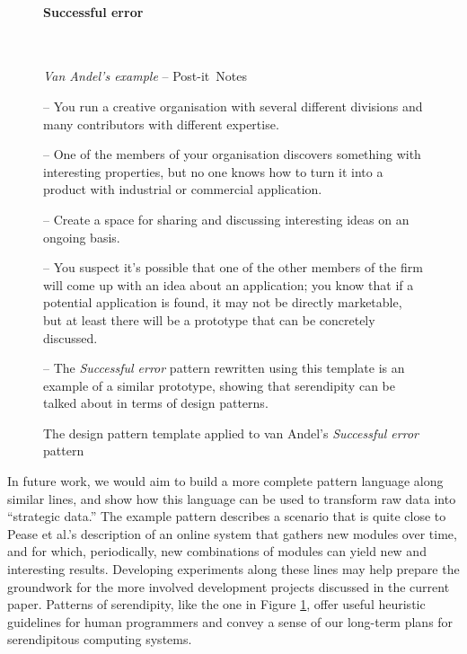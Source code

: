 \begin{figure}[!ht]
\begin{mdframed}
\paragraph{\textbf{Successful error}}~
\baselineskip
\begin{flushright}\emph{Van Andel's example} -- Post-it\texttrademark\ Notes
\end{flushright}
\vspace{-.15cm}
\begin{description}[itemsep=2pt]
\item[{\tt context}] -- You run a creative organisation with several different divisions and many contributors with different expertise.  
\item[{\tt problem}] -- One of the members of your organisation
  discovers something with interesting properties, but no one
  knows how to turn it into a product with industrial or commercial application.
\item[{\tt solution}] -- Create a space for sharing and discussing
  interesting ideas on an ongoing basis.
\item[{\tt rationale}] -- You suspect it's possible that one of the
  other members of the firm will come up with an idea about an
  application; you know that if a potential application is found, it
  may not be directly marketable, but at least there will be a
  prototype that can be concretely discussed.
\item[{\tt resolution}] -- The \emph{Successful error} pattern
  rewritten using this template is an example of a similar
  prototype, showing that serendipity can be talked about in
  terms of design patterns.
\end{description}
\end{mdframed}
\caption{The design pattern template applied to van Andel's \emph{Successful error} pattern\label{fig:va-pattern-figure}}
\end{figure}

In future work, we would aim to build a more complete pattern language
along similar lines, and show how this language can be used to
transform raw data into ``strategic data.''
%
The example pattern describes a scenario that is quite close to Pease et al.'s \citeyear{pease2013discussion} description of an online
system that gathers new modules over time, and for which,
periodically, new combinations of modules can yield new and
interesting results.
%
Developing experiments along these lines may help prepare the
groundwork for the more involved development projects discussed in the
current paper.
%
Patterns of serendipity, like the one in Figure \ref{fig:va-pattern-figure},
offer useful heuristic guidelines for human programmers and convey a sense of our long-term
plans for serendipitous computing systems.



